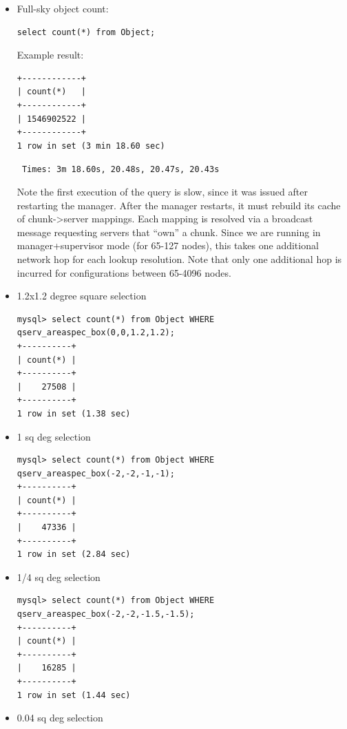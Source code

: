 \documentclass[DM,toc]{lsstdoc}
\begin{document}
\begin{itemize}
\item
  Full-sky object count:

\begin{verbatim}
select count(*) from Object;
\end{verbatim}

Example result:

\begin{verbatim}
+------------+
| count(*)   |
+------------+
| 1546902522 |
+------------+
1 row in set (3 min 18.60 sec)
\end{verbatim}

\texttt{~Times:~3m~18.60s,~20.48s,~20.47s,~20.43s}

Note the first execution of the query is slow, since it was issued after
restarting the manager. After the manager restarts, it must rebuild its
cache of chunk-\textgreater{}server mappings. Each mapping is resolved
via a broadcast message requesting servers that ``own'' a chunk. Since
we are running in manager+supervisor mode (for 65-127 nodes), this takes
one additional network hop for each lookup resolution. Note that only
one additional hop is incurred for configurations between 65-4096 nodes.

\item
  1.2x1.2 degree square selection

\begin{verbatim}
mysql> select count(*) from Object WHERE qserv_areaspec_box(0,0,1.2,1.2);
+----------+
| count(*) |
+----------+
|    27508 |
+----------+
1 row in set (1.38 sec)
\end{verbatim}

\item
  1 sq deg selection

\begin{verbatim}
mysql> select count(*) from Object WHERE qserv_areaspec_box(-2,-2,-1,-1);
+----------+
| count(*) |
+----------+
|    47336 |
+----------+
1 row in set (2.84 sec)
\end{verbatim}

\item
  1/4 sq deg selection

\begin{verbatim}
mysql> select count(*) from Object WHERE qserv_areaspec_box(-2,-2,-1.5,-1.5);
+----------+
| count(*) |
+----------+
|    16285 |
+----------+
1 row in set (1.44 sec)
\end{verbatim}

\item
  0.04 sq deg selection


\end{itemize}
\end{document}
